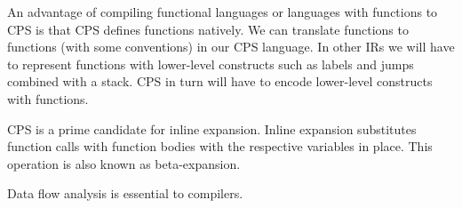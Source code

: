 An advantage of compiling functional languages or languages with functions to \ac{CPS} is that \ac{CPS} defines functions natively. We can translate functions to functions (with some conventions) in our \ac{CPS} language. In other \acp{IR} we will have to represent functions with lower-level constructs such as labels and jumps combined with a stack. \ac{CPS} in turn will have to encode lower-level constructs with functions.

\ac{CPS} is a prime candidate for inline expansion. Inline expansion substitutes function calls with function bodies with the respective variables in place. This operation is also known as beta-expansion.

Data flow analysis is essential to compilers.